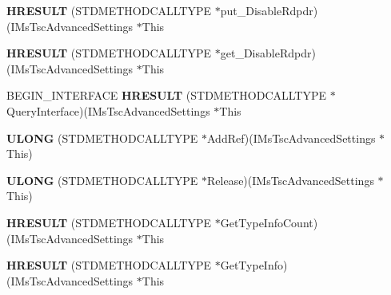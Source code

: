 \begin{DoxyCompactItemize}
{\bfseries H\+R\+E\+S\+U\+LT} (S\+T\+D\+M\+E\+T\+H\+O\+D\+C\+A\+L\+L\+T\+Y\+PE $\ast$put\+\_\+\+Disable\+Rdpdr)(I\+Ms\+Tsc\+Advanced\+Settings $\ast$This
\item 
\mbox{\label{struct_i_ms_tsc_advanced_settings_vtbl_ab6210e0f56e5f8ce18b0b2ba26af221f}} 
{\bfseries H\+R\+E\+S\+U\+LT} (S\+T\+D\+M\+E\+T\+H\+O\+D\+C\+A\+L\+L\+T\+Y\+PE $\ast$get\+\_\+\+Disable\+Rdpdr)(I\+Ms\+Tsc\+Advanced\+Settings $\ast$This
\item 
\mbox{\label{struct_i_ms_tsc_advanced_settings_vtbl_abdbfff9554e789605ae26e858aee5546}} 
B\+E\+G\+I\+N\+\_\+\+I\+N\+T\+E\+R\+F\+A\+CE {\bfseries H\+R\+E\+S\+U\+LT} (S\+T\+D\+M\+E\+T\+H\+O\+D\+C\+A\+L\+L\+T\+Y\+PE $\ast$Query\+Interface)(I\+Ms\+Tsc\+Advanced\+Settings $\ast$This
\item 
\mbox{\label{struct_i_ms_tsc_advanced_settings_vtbl_a2b7d2b8879d149873ae3a28c7c3b5ccd}} 
{\bfseries U\+L\+O\+NG} (S\+T\+D\+M\+E\+T\+H\+O\+D\+C\+A\+L\+L\+T\+Y\+PE $\ast$Add\+Ref)(I\+Ms\+Tsc\+Advanced\+Settings $\ast$This)
\item 
\mbox{\label{struct_i_ms_tsc_advanced_settings_vtbl_ad290a4f7ed10166de2d2f00cbb30eec4}} 
{\bfseries U\+L\+O\+NG} (S\+T\+D\+M\+E\+T\+H\+O\+D\+C\+A\+L\+L\+T\+Y\+PE $\ast$Release)(I\+Ms\+Tsc\+Advanced\+Settings $\ast$This)
\item 
\mbox{\label{struct_i_ms_tsc_advanced_settings_vtbl_a09af511d45e45b9cf990cfc5210b9b02}} 
{\bfseries H\+R\+E\+S\+U\+LT} (S\+T\+D\+M\+E\+T\+H\+O\+D\+C\+A\+L\+L\+T\+Y\+PE $\ast$Get\+Type\+Info\+Count)(I\+Ms\+Tsc\+Advanced\+Settings $\ast$This
\item 
\mbox{\label{struct_i_ms_tsc_advanced_settings_vtbl_a3d4e398d7ea15e02e3056c380edd74b4}} 
{\bfseries H\+R\+E\+S\+U\+LT} (S\+T\+D\+M\+E\+T\+H\+O\+D\+C\+A\+L\+L\+T\+Y\+PE $\ast$Get\+Type\+Info)(I\+Ms\+Tsc\+Advanced\+Settings $\ast$This
\item 
\mbox{\label{struct_i_ms_tsc_advanced_settings_vtbl_a269d301a3d809441e81810ffb3bd3ea8}} 

\end{DoxyCompactItemize}
